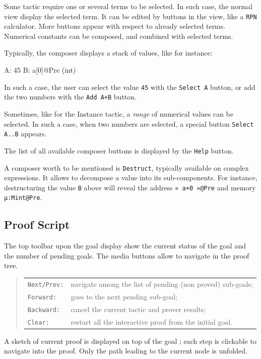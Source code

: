 Some tactic require one or several terms to be selected.
In such case, the normal view display the selected term.
It can be edited by buttons in the view, like a \texttt{RPN} calculator. More buttons appear with respect to already selected terms. Numerical constants can be composed, and combined with selected terms.

Typically, the composer displays a stack of values, like for instance:
\begin{ccode}
  A: 45
  B: a[0]@Pre (int)
\end{ccode}

In such a case, the user can select the value \texttt{45} with the \texttt{Select A} button, or add the two numbers with the \texttt{Add A+B} button.

Sometimes, like for the Instance tactic, a \emph{range} of numerical values can be selected. In such a case, when two numbers are selected, a special button \texttt{Select A..B} appears.

The list of all available composer buttons is displayed by the \texttt{Help} button.

A composer worth to be mentioned is \texttt{Destruct}, typically available on complex expressions. It allows to decompose a value into its sub-components. For instance, destructuring the value \texttt{B} above will reveal the address \texttt{« a+0 »@Pre} and memory \texttt{µ:Mint@Pre}.

\subsection{Proof Script}

The top toolbar upon the goal display show the current status of the goal and the number of pending goals. The media buttons allow to navigate in the proof tree.
\begin{quote}
\begin{tabular}{ll}
\verb+Next/Prev:+ & navigate among the list of pending (non proved) sub-goals; \\
\verb+Forward:+ & goes to the next pending sub-goal; \\
\verb+Backward:+ & cancel the current tactic and prover results; \\
\verb+Clear:+ & restart all the interactive proof from the initial goal.
\end{tabular}
\end{quote}

A sketch of current proof is displayed on top of the goal ; each step is clickable to navigate into the proof. Only the path leading to the current node is unfolded.

